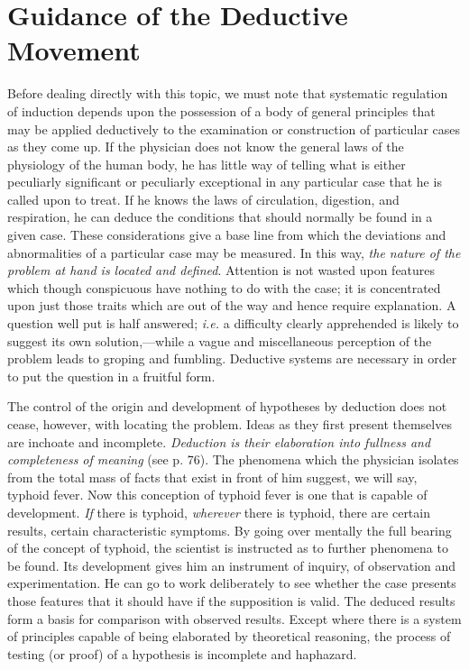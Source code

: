 \documentclass[letterpaper]{book}
\begin{document}
\section{Guidance of the Deductive Movement}


Before dealing directly with this topic, we must note that systematic
regulation of induction depends upon the possession of a body of general
principles that may be applied deductively to the examination or
construction of particular cases as they come up. If the physician does
not know the general laws of the physiology of the human body, he has
little way of telling what is either peculiarly significant or
peculiarly
exceptional in any particular case that he is called upon to treat. If
he knows the laws of circulation, digestion, and respiration, he can
deduce the conditions that should normally be found in a given case.
These considerations give a base line from which the deviations and
abnormalities of a particular case may be measured. In this way,
\emph{the nature of the problem at hand is located and defined}.
Attention is not wasted upon features which though conspicuous have
nothing to do with the case; it is concentrated upon just those traits
which are out of the way and hence require explanation. A question well
put is half answered; \emph{i.e.} a difficulty clearly apprehended is
likely to suggest its own solution,---while a vague and miscellaneous
perception of the problem leads to groping and fumbling. Deductive
systems are necessary in order to put the question in a fruitful form.


The control of the origin and development of hypotheses by deduction
does not cease, however, with locating the problem. Ideas as they first
present themselves are inchoate and incomplete. \emph{Deduction is their
elaboration into fullness and completeness of meaning} (see p. 76). The
phenomena which the physician isolates from the total mass of facts that
exist in front of him suggest, we will say, typhoid fever. Now this
conception of typhoid fever is one that is capable of development.
\emph{If} there is typhoid, \emph{wherever} there is typhoid, there are
certain results, certain characteristic symptoms. By going over mentally
the full bearing of the concept of typhoid, the scientist is instructed
as to further phenomena to be found. Its development gives him an
instrument of inquiry, of observation and experimentation. He can go to
work deliberately to see
whether
the case presents those features that it should have if the supposition
is valid. The deduced results form a basis for comparison with observed
results. Except where there is a system of principles capable of being
elaborated by theoretical reasoning, the process of testing (or proof)
of a hypothesis is incomplete and haphazard.
\end{document}
